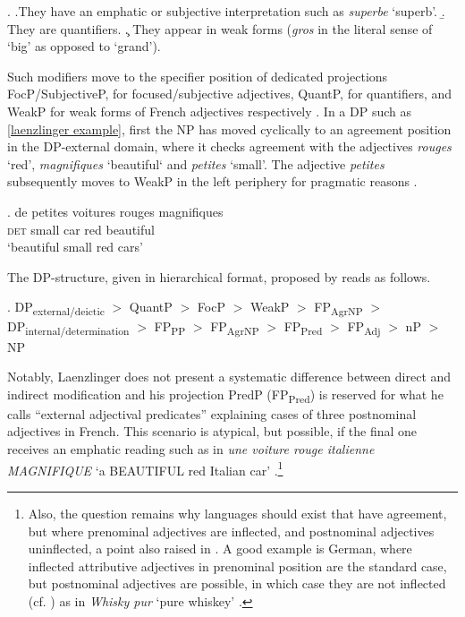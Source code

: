 \ex. \a.They have an emphatic or subjective interpretation such as \textit{superbe} `superb’.
\b. They are quantifiers.
\c. They appear in weak forms (\textit{gros} in the literal sense of `big’ as opposed to `grand’).

Such modifiers move to the specifier position of dedicated projections FocP/SubjectiveP, for focused/subjective adjectives, QuantP, for quantifiers, and WeakP for weak forms of  French adjectives respectively \citep[666–668]{laenzlinger:2005:french}. In a DP such as \ref{laenzlinger example}, first the NP has moved cyclically to an agreement position in the DP-external domain, where it checks agreement with the adjectives \textit{rouges} `red’, \textit{magnifiques} `beautiful‘ and \textit{petites} `small’. The adjective \textit{petites} subsequently moves to WeakP in the left periphery for pragmatic reasons \citep[667]{laenzlinger:2005:french}.

\exg. de petites voitures rouges magnifiques \\
\textsc{det} small car red beautiful\\
`beautiful small red cars’ \null \hfill \citep[668]{laenzlinger:2005:french} \label{laenzlinger example}

The DP-structure, given in hierarchical format, proposed by \citet{laenzlinger:2005:french, laenzlinger:2011:elements} reads as follows.

\ex. DP\textsubscript{external/deictic} $>$ QuantP $>$ FocP $>$ WeakP $>$ FP\textsubscript{AgrNP} $>$ DP\textsubscript{internal/determination} $>$ FP\textsubscript{PP} $>$ FP\textsubscript{AgrNP} $>$ FP\textsubscript{Pred} $>$ FP\textsubscript{Adj} $>$ nP $>$ NP \null \hfill \citep[35]{laenzlinger:2011:elements}

Notably, Laenzlinger does not present a systematic difference between direct and indirect modification and his projection PredP (FP\textsubscript{Pred}) is reserved for what he calls ``external adjectival predicates” \citep[670]{laenzlinger:2005:french} explaining cases of three postnominal adjectives in French. This scenario is atypical, but possible, if the final one receives an emphatic reading such as in \textit{une voiture rouge italienne MAGNIFIQUE} `a BEAUTIFUL red Italian car’ \citep[663–664, 671–672]{laenzlinger:2005:french}.\footnote{Also, the question remains why languages should exist that have agreement, but where prenominal adjectives are inflected, and postnominal adjectives uninflected, a point also raised in \citet[20, Footnote 9]{bortolotto:2016:RA}. A good example is German, where inflected attributive adjectives in prenominal position are the standard case, but postnominal adjectives are possible, in which case they are not inflected (cf. \citealt{trost:2011:whiskey}) as in \textit{Whisky pur} `pure whiskey’ \citep[383]{trost:2006:die}.}  

